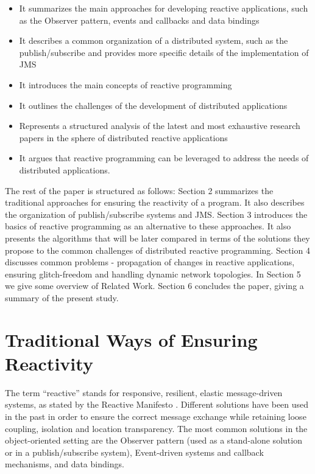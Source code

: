 \documentclass{sigplanconf}
\begin{document}
\begin{itemize} \itemsep1pt \parskip0pt 
  \item It summarizes the main approaches for developing reactive applications, such as the Observer pattern, events and callbacks and data bindings
  \item It describes a common organization of a distributed system, such as the publish/subscribe and provides more specific details of the implementation of JMS
  \item It introduces the main concepts of reactive programming
  \item It outlines the challenges of the development of distributed applications
  \item Represents a structured analysis of the latest and most exhaustive research papers in the sphere of distributed reactive applications
  \item It argues that reactive programming can be leveraged to address the needs of distributed applications.
\end{itemize}

The rest of the paper is structured as follows: Section 2 summarizes the traditional approaches for ensuring the reactivity of a program. It also describes the organization of publish/subscribe systems and JMS. Section 3 introduces the basics of reactive programming as an alternative to these approaches. It also presents the algorithms that will be later compared in terms of the solutions they propose to the common challenges of distributed reactive programming. Section 4 discusses common problems - propagation of changes in reactive applications, ensuring glitch-freedom and handling dynamic network topologies. In Section 5 we give some overview of Related Work. Section 6 concludes the paper, giving a summary of the present study.

\section{Traditional Ways of Ensuring Reactivity}

The term “reactive” stands for responsive, resilient, elastic message-driven systems, as stated by the Reactive Manifesto \cite{rm}. Different solutions have been used in the past in order to ensure the correct message exchange while retaining loose coupling, isolation and location transparency. The most common solutions in the object-oriented setting are the Observer pattern (used as a stand-alone solution or in a publish/subscribe system), Event-driven systems and callback mechanisms, and data bindings.
\end{document}
